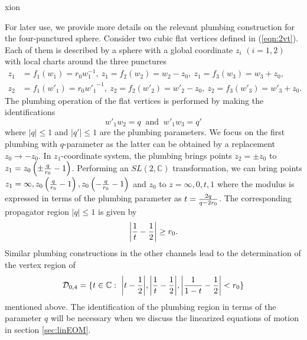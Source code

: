 xion\documentclass[12pt]{article}
\def\be{\begin{equation}}
\def\ee{\end{equation}}
\numberwithin{equation}{section}
\begin{document}
For later use, we provide more details on the relevant plumbing construction for the four-punctured sphere. Consider two cubic flat vertices defined in (\ref{eqn:2vt}). Each of them is described by a sphere with a global coordinate $z_i$ $(i=1,2)$ with local charts around the three punctures
\be
\begin{aligned}
    z_1&=f_1(w_1)=r_0 w_1^{-1},~z_1=f_2(w_2)=w_2-z_0,~z_1=f_3(w_3)=w_3+z_0,
    \\
    z_2&=f_1(w'_1)=r_0 {w'_1}^{-1},~z_2=f_2(w'_2)=w'_2-z_0,~z_2=f_3(w'_3)=w'_3+z_0.
\end{aligned}
\ee
The plumbing operation of the flat vertices is performed by making the identifications
\begin{equation}\label{eqn:plumbingPara}
    w'_1w_2=q~\text{ and }~w'_1w_3=q'
\end{equation}
where $|q|\leq1$ and $|q'|\leq1$ are the plumbing parameters. We focus on the first plumbing with $q$-parameter as the latter can be obtained by a replacement $z_0\rightarrow -z_0$. In $z_1$-coordinate system, the plumbing brings points $z_2=\pm z_0$ to $z_1=z_0\left(\pm{q\over r_0}-1\right)$. Performing an $SL(2,\mathbb{C})$ transformation, we can bring points $z_1=\infty,z_0\left({q\over r_0}-1\right),z_0\left(-{q\over r_0}-1\right)$ and $z_0$ to $z=\infty,0,t,1$ where the modulus is expressed in terms of the plumbing parameter as $t={2q\over q-2r_0}$. The corresponding propagator region $|q|\leq1$ is given by
\begin{equation}\label{eqn:propRegion}
    \bigg| {1\over t}-{1\over2}\bigg|\geq r_0.
\end{equation}
Similar plumbing constructions in the other channels lead to the determination of the vertex region of \cite{Mazel:2024alu}
\be
{\cal D}_{0,4} =\{t\in \mathbb{C}: \,\, \abs{t-\frac{1}{2}}, \abs{\frac{1}{t}-\frac{1}{2}}, \abs{\frac{1}{1-t}-\frac{1}{2}} < r_0\}
\label{vertexRegionFour}
\ee
mentioned above. The identification of the plumbing region in terms of the parameter $q$ will be necessary when we discuss the linearized equations of motion in section \ref{sec:linEOM}.
\end{document}
